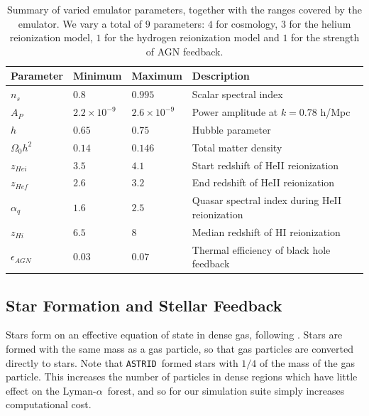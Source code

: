 \documentclass[a4paper,11pt]{article}
\newcommand{\Lya}{Lyman-$\alpha$}
\newcommand{\astrid}{\texttt{ASTRID}}
\begin{document}
\begin{table}
\begin{centering}
  \begin{tabular}{llll}
  \hline
  Parameter & Minimum & Maximum & Description \\
    \hline
    $n_s$  &  $0.8$  & $0.995$ & Scalar spectral index \\
    $A_P$  &  $2.2 \times 10^{-9}$  & $2.6 \times 10^{-9}$ & Power amplitude at $k = 0.78$ h/Mpc \\
    $h$    & $0.65$  & $0.75$ & Hubble parameter \\
    $\Omega_0 h^2$ & $0.14$ & $0.146$ & Total matter density \\
    $z_{Hei}$      & $3.5$  & $4.1$  & Start redshift of HeII reionization \\
    $z_{Hef}$      & $2.6$  & $3.2$  & End redshift of HeII reionization \\
    $\alpha_q$     & $1.6$  & $2.5$ & Quasar spectral index during HeII reionization  \\
    $z_{Hi}$        & $6.5$ & $8$   & Median redshift of HI reionization \\
    $\epsilon_{AGN}$ & $0.03$ & $0.07$ & Thermal efficiency of black hole feedback \\
    \hline
  \end{tabular}
  \caption{Summary of varied emulator parameters, together with the ranges covered by the emulator. We vary a total of $9$ parameters: $4$ for cosmology, $3$ for the helium reionization model, $1$ for the hydrogen reionization model and $1$ for the strength of AGN feedback.}
  \label{tab:emulatorparams}
  \end{centering}
\end{table}

\subsection{Star Formation and Stellar Feedback}
\label{sec:stellar}

Stars form on an effective equation of state in dense gas, following \cite{Springel:2003}. Stars are formed with the same mass as a gas particle, so that gas particles are converted directly to stars. Note that \astrid~formed stars with $1/4$ of the mass of the gas particle. This increases the number of particles in dense regions which have little effect on the \Lya~forest, and so for our simulation suite simply increases computational cost.
\end{document}
